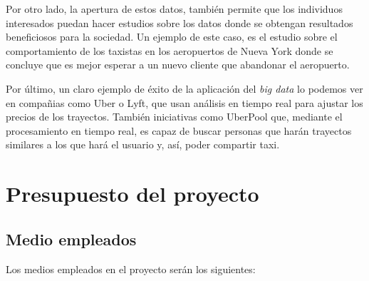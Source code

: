 Por otro lado, la apertura de estos datos, también permite que los individuos interesados puedan hacer estudios sobre los datos donde se obtengan resultados beneficiosos para la sociedad. Un ejemplo de este caso, es el estudio sobre el comportamiento de los taxistas en los aeropuertos de Nueva York \cite{aeropuerto} donde se concluye que es mejor esperar a un nuevo cliente que abandonar el aeropuerto.

Por último, un claro ejemplo de éxito de la aplicación del \textit{big data} lo podemos ver en compañias como Uber \cite{uber} o Lyft, que usan análisis en tiempo real para ajustar los precios de los trayectos. También iniciativas como UberPool que, mediante el procesamiento en tiempo real, es capaz de buscar personas que harán trayectos similares a los que hará el usuario y, así, poder compartir taxi.

\section{Presupuesto del proyecto}
\subsection{Medio empleados}
Los medios empleados en el proyecto serán los siguientes:

